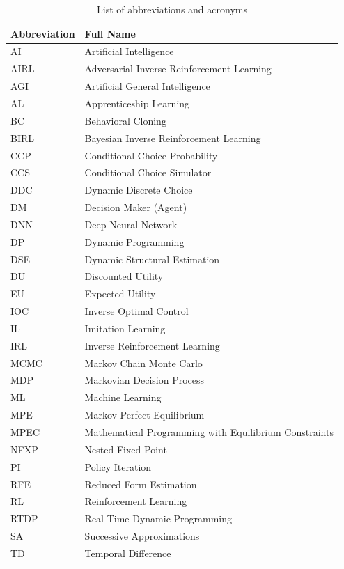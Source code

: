\begin{table}[h!]
\centering
\caption{List of abbreviations and acronyms}
\begin{tabular}{|l|l|}
\hline
\textbf{Abbreviation} & \textbf{Full Name} \\
\hline
AI & Artificial Intelligence \\
AIRL & Adversarial Inverse Reinforcement Learning\\
AGI & Artificial General Intelligence \\
AL & Apprenticeship Learning \\
BC & Behavioral Cloning \\
BIRL & Bayesian Inverse Reinforcement Learning\\
CCP & Conditional Choice Probability \\
CCS & Conditional Choice Simulator \\
DDC & Dynamic Discrete Choice \\
DM  & Decision Maker (Agent) \\
DNN & Deep Neural Network \\
DP  & Dynamic Programming \\
DSE & Dynamic Structural Estimation \\
DU & Discounted Utility \\
EU   & Expected Utility\\
IOC & Inverse Optimal Control \\
IL & Imitation Learning  \\
IRL & Inverse Reinforcement Learning\\
MCMC & Markov Chain Monte Carlo \\
MDP & Markovian Decision Process \\
ML & Machine Learning \\
MPE & Markov Perfect Equilibrium \\
MPEC & Mathematical Programming with Equilibrium Constraints\\
NFXP & Nested Fixed Point \\
PI  & Policy Iteration \\
RFE & Reduced Form Estimation \\
RL & Reinforcement Learning  \\
RTDP & Real Time Dynamic Programming \\
SA  & Successive Approximations \\
TD  & Temporal Difference\\
\hline
\end{tabular}
\label{tab:abbrevs}
\end{table}
